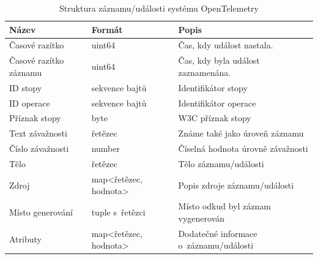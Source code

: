 \begin{table}[H]
\centering
\begin{tabular}{|p{4cm}|p{4.3cm}|p{5.5cm}|}
\hline
\textbf{Název} & \textbf{Formát} & \textbf{Popis} \\ \hline
Časové razítko & uint64 & Čas, kdy událost nastala. \\ \hline
Časové razítko záznamu & uint64 & Čas, kdy byla událost zaznamenána. \\ \hline
ID stopy & sekvence bajtů & Identifikátor stopy \\ \hline
ID operace & sekvence bajtů & Identifikátor operace \\ \hline
Příznak stopy & byte & W3C příznak stopy \\ \hline
Text závažnosti & řetězec & Známe také jako úroveň záznamu \\ \hline
Číslo závažnosti & number & Číselná hodnota úrovně závažnosti \\ \hline
Tělo & řetězec & Tělo záznamu/události \\ \hline
Zdroj & map<řetězec, hodnota> & Popis zdroje záznamu/události \\ \hline
Místo generování & tuple s~řetězci & Místo odkud byl záznam vygenerován \\ \hline
Atributy & map<řetězec, hodnota> & Dodatečné informace o~záznamu/události \\ \hline
\end{tabular}
\caption{Struktura záznamu/události systému OpenTelemetry}
\end{table}


